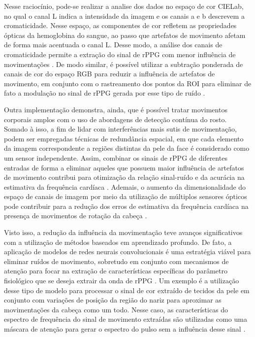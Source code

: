 Nesse raciocínio, pode-se realizar a analise dos dados no espaço de cor CIELab, no qual o canal L indica a intensidade da imagem e os canais a e b descrevem a cromaticidade. Nesse espaço, as componentes de cor refletem as propriedades ópticas da hemoglobina do sangue, ao passo que artefatos de movimento afetam de forma mais acentuada o canal L. Desse modo, a análise dos canais de cromaticidade permite a extração do sinal de rPPG com menor influência de movimentações \cite{yang2016motion}. De modo similar, é possível utilizar a subtração ponderada de canais de cor do espaço RGB para reduzir a influência de artefatos de movimento, em conjunto com o rastreamento dos pontos da ROI para eliminar de fato a modulação no sinal de rPPG gerada por esse tipo de ruído \cite{feng2014motion}. 


Outra implementação demonstra, ainda, que é possível tratar movimentos corporais amplos com o uso de abordagens de detecção contínua do rosto. Somado à isso, a fim de lidar com interferências mais sutis de movimentação, podem ser empregadas técnicas de redundância espacial, em que cada elemento da imagem correspondente a regiões distintas da pele da face é considerado como um sensor independente. Assim, combinar os sinais de rPPG de diferentes entradas de forma a eliminar aqueles que possuem maior influência de artefatos de movimento contribui para otimização da relação sinal-ruído e da acurácia na estimativa da frequência cardíaca \cite{wang2014exploiting}. Ademais, o aumento da dimensionalidade do espaço de canais de imagem por meio da utilização de múltiplos sensores ópticos pode contribuir para a redução dos erros de estimativa da frequência cardíaca na presença de movimentos de rotação da cabeça \cite{estepp2014recovering}.

Visto isso, a redução da influência da movimentação teve avanços significativos com a utilização de métodos baseados em aprendizado profundo. De fato, a aplicação de modelos de redes neurais convolucionais é uma estratégia viável para eliminar ruídos de movimento, sobretudo em conjunto com mecanismos de atenção para focar na extração de características específicas do parâmetro fisiológico que se deseja extrair da onda de rPPG \cite{wu2022motion}. Um exemplo é a utilização desse tipo de modelo para processar o sinal de cor extraído de tecidos da pele em conjunto com variações de posição da região do nariz para aproximar as movimentações da cabeça como um todo. Nesse caso, as características do espectro de frequência do sinal de movimento extraídas são utilizadas como uma máscara de atenção para gerar o espectro do pulso sem a influência desse sinal \cite{liu2021manet}.


